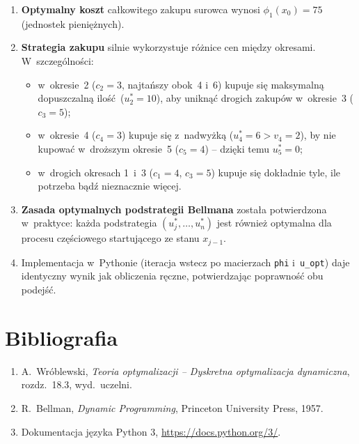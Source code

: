 \documentclass[12pt,a4paper]{article}
\begin{document}
\begin{enumerate}
    \item \textbf{Optymalny koszt} ca\l{}kowitego zakupu surowca wynosi
          $\phi_1(x_0)=75$ (jednostek pieni\k{e}\.znych).

    \item \textbf{Strategia zakupu} silnie wykorzystuje r\'o\.znice cen mi\k{e}dzy
          okresami. W~szczeg\'olno\'sci:
          \begin{itemize}
              \item w~okresie~2 ($c_2=3$, najta\'nszy obok~4 i~6) kupuje si\k{e}
                    maksymaln\k{a} dopuszczaln\k{a} ilo\'s\'c~($u_2^*=10$),
                    aby unikn\k{a}\'c drogich zakup\'ow w~okresie~3 ($c_3=5$);
              \item w~okresie~4 ($c_4=3$) kupuje si\k{e} z~nadwy\.zk\k{a}
                    ($u_4^*=6 > v_4=2$), by nie kupowa\'c w~dro\.zszym
                    okresie~5 ($c_5=4$) -- dzi\k{e}ki temu $u_5^*=0$;
              \item w~drogi\-ch okresach 1~i~3 ($c_1=4$, $c_3=5$) kupuje si\k{e}
                    dok\l{}adnie tyle, ile potrzeba b\k{a}d\'z nieznacznie wi\k{e}cej.
          \end{itemize}

    \item \textbf{Zasada optymalnych podstrategii Bellmana} zosta\l{}a
          potwierdzona w~praktyce: ka\.zda podstrategia $(u_j^*,\ldots,u_n^*)$
          jest r\'ownie\.z optymalna dla procesu cz\k{e}\'sciowego
          startuj\k{a}cego ze stanu $x_{j-1}$.

    \item Implementacja w~Pythonie (iteracja wstecz po macierzach
          \texttt{phi} i~\texttt{u\_opt}) daje identyczny wynik jak
          obliczenia r\k{e}czne, potwierdzaj\k{a}c poprawno\'s\'c obu podej\'s\'c.
\end{enumerate}

\section{Bibliografia}
\begin{enumerate}
    \item A.~Wr\'oblewski, \textit{Teoria optymalizacji -- Dyskretna
          optymalizacja dynamiczna}, rozdz.~18.3, wyd.~uczelni.
    \item R.~Bellman, \textit{Dynamic Programming}, Princeton University
          Press, 1957.
    \item Dokumentacja j\k{e}zyka Python 3, \url{https://docs.python.org/3/}.
\end{enumerate}
\end{document}
